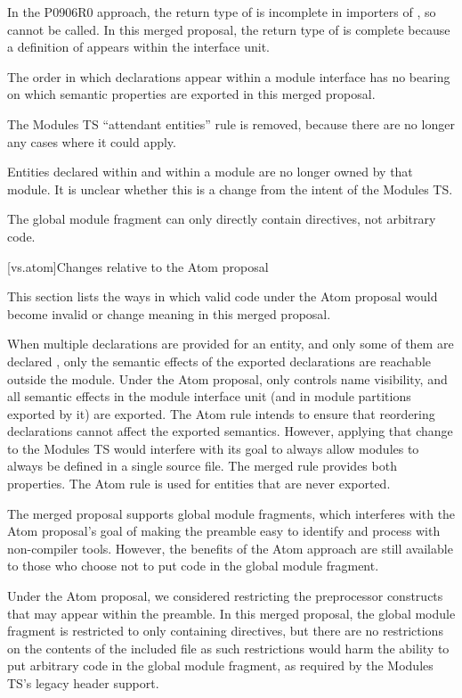 In the P0906R0 approach,
the return type of  is incomplete
in importers of ,
so  cannot be called.
In this merged proposal,
the return type of  is complete
because a definition of 
appears within the interface unit.
\begin{note}
The order in which declarations appear within a module interface
has no bearing on which semantic properties are exported
in this merged proposal.
\end{note}

The Modules TS ``attendant entities'' rule is removed,
because there are no longer any cases where it could apply.

\pnum
Entities declared within  and 
within a module are no longer owned by that module.
It is unclear whether this is a change from the intent of
the Modules TS.

\pnum
The global module fragment can only
directly contain  directives,
not arbitrary code.

[vs.atom]{Changes relative to the Atom proposal}

\pnum
This section lists the ways in which valid code under the Atom proposal
would become invalid or change meaning in this merged proposal.

\pnum
When multiple declarations are provided for an entity,
and only some of them are declared ,
only the semantic effects of the exported declarations
are reachable outside the module.
Under the Atom proposal,
 only controls name visibility,
and all semantic effects in the module interface unit
(and in module partitions exported by it)
are exported.
The Atom rule intends to ensure that
reordering declarations cannot affect the exported semantics.
However, applying that change to the Modules TS
would interfere with its goal to always allow modules
to always be defined in a single source file.
The merged rule provides both properties.
The Atom rule is used for entities that are never exported.

\pnum
The merged proposal supports global module fragments,
which interferes with the Atom proposal's goal
of making the preamble easy to identify and process
with non-compiler tools.
However, the benefits of the Atom approach are still available
to those who choose not to put code in the global module fragment.

\pnum
Under the Atom proposal,
we considered restricting the preprocessor constructs that may appear
within the preamble.
In this merged proposal,
the global module fragment is restricted
to only containing  directives,
but there are no restrictions on the contents
of the included file
as such restrictions would harm the ability
to put arbitrary code in the global module fragment,
as required by the Modules TS's legacy header support.

